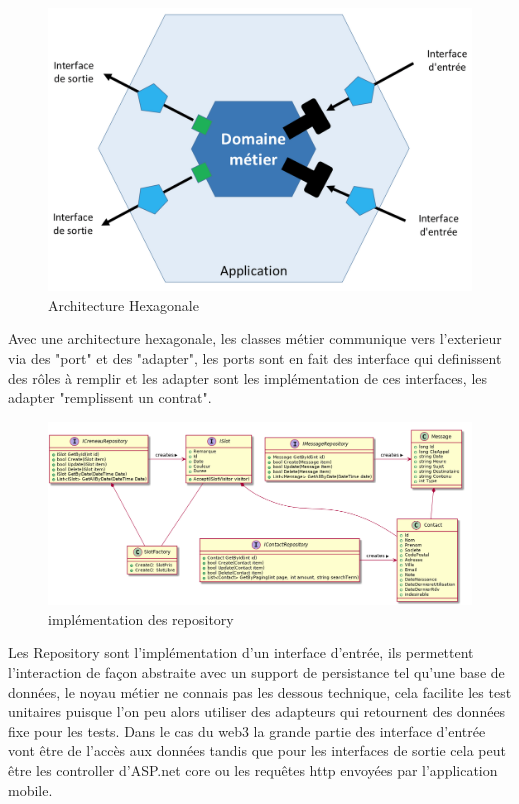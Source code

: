 \begin{figure}[!h]
    \centering
    \includegraphics[width=0.7\linewidth]{Images/hexarch}
    \caption{Architecture Hexagonale}
    \label{fig:archhexa}
\end{figure}

Avec une architecture hexagonale, les classes métier communique vers l'exterieur via des "port" et 
des "adapter", les ports sont en fait des interface qui definissent des rôles à remplir 
et les adapter sont les implémentation de ces interfaces, les adapter "remplissent un contrat".



\begin{figure}[h]
	\centering
	\includegraphics[width=1\linewidth]{Images/slotumlpart1}
	\caption{ implémentation des repository }
	\label{fig:otherrepo}
\end{figure}

Les Repository sont l'implémentation d'un interface d'entrée, ils permettent l'interaction de façon 
abstraite avec un support de persistance tel qu'une base de données, le noyau métier ne connais pas 
les dessous technique, cela facilite les test unitaires puisque l'on peu alors utiliser 
des adapteurs qui retournent des données fixe pour les tests. Dans le cas du web3 la grande 
partie des interface d'entrée vont être de l'accès aux données tandis que pour les interfaces
de sortie cela peut être les controller d'ASP.net core ou les requêtes http envoyées 
par l'application mobile. \newline
\newpage

